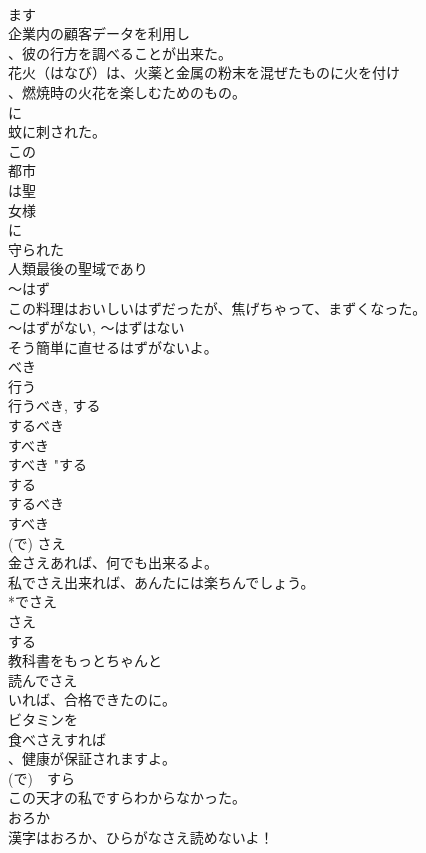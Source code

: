 \documentclass[8pt]{extreport}
\begin{document}
\begin{CJK}{UTF8}{min}
\\	ます 
\\	企業内の顧客データを利用し 
\\	、彼の行方を調べることが出来た。
\\	花火（はなび）は、火薬と金属の粉末を混ぜたものに火を付け 
\\	、燃焼時の火花を楽しむためのもの。
\\	に 
\\	蚊に刺された。
\\	この
\\	都市
\\	は聖
\\	女様
\\	に
\\	守られた
\\	人類最後の聖域であり
\\	～はず	
\\	この料理はおいしいはずだったが、焦げちゃって、まずくなった。
\\	～はずがない, ～はずはない	
\\	そう簡単に直せるはずがないよ。
\\	べき 
\\	行う 
\\	行うべき, する 
\\	するべき 
\\	すべき	
\\	すべき	"する 
\\	する 
\\	するべき 
\\	すべき 
\\	(で) さえ	
\\	金さえあれば、何でも出来るよ。
\\	私でさえ出来れば、あんたには楽ちんでしょう。
\\	*でさえ 
\\	さえ 
\\	する	
\\	教科書をもっとちゃんと
\\	読んでさえ
\\	いれば、合格できたのに。
\\	ビタミンを
\\	食べさえすれば
\\	、健康が保証されますよ。
\\	(で)　すら	
\\	この天才の私ですらわからなかった。
\\	おろか	
\\	漢字はおろか、ひらがなさえ読めないよ！

\end{CJK}
\end{document}
